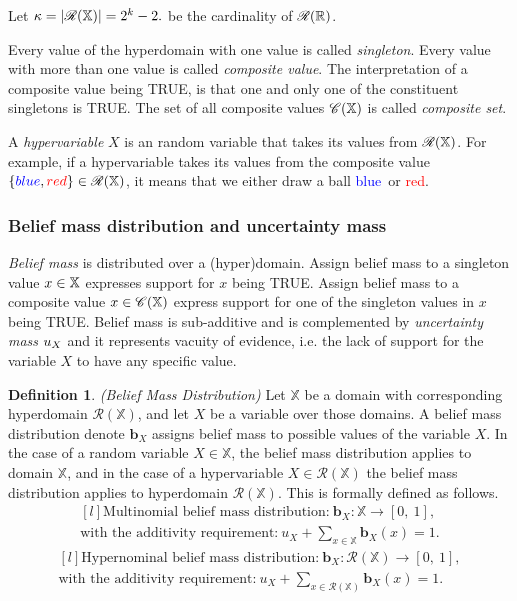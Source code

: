 \documentclass[a4paper,12pt]{article}
\theoremstyle{definition}
\newtheorem{definition}{Definition}[section]
\numberwithin{equation}{section}
\newcommand{\red}{\textcolor{red}{red}}
\newcommand{\blue}{\textcolor{blue}{blue}}
\begin{document}
Let $\kappa = |\mathcal{R}(\mathbb{X})| = 2^k -2\text{.}$ be the cardinality of $\mathcal{R}(\mathbb{R})$.

Every value of the hyperdomain with one value is called \emph{singleton}. Every value with more than one value is called \emph{composite value}. The interpretation of a composite value being TRUE, is that one and only one of the constituent singletons is TRUE. The set of all composite values $\mathcal{C}(\mathbb{X})$ is called \emph{composite set}.

A \emph{hypervariable} $X$ is an random variable that takes its values from $\mathcal{R}(\mathbb{X})$. For example, if a hypervariable takes its values from the composite value $\{\blue, \red\} \in \hdom{X}$, it means that we either draw a ball \blue\ or \red.

\subsubsection{Belief mass distribution and uncertainty mass}

\emph{Belief mass} is distributed over a (hyper)domain. Assign belief mass to a singleton value $x \in \mathbb{X}$ expresses support for $x$ being TRUE. Assign belief mass to a composite value $x \in \mathcal{C}(\mathbb{X})$ express support for one of the singleton values in $x$ being TRUE. Belief mass is sub-additive and is complemented by \emph{uncertainty mass} $u_{X}$ and it represents vacuity of evidence, i.e. the lack of support for the variable $X$ to have any specific value.

\begin{definition}
	\emph{(Belief Mass Distribution)} Let $\mathbb{X}$ be a domain with corresponding hyperdomain $\mathcal{R}(\mathbb{X})$, and let $X$ be a variable over those domains. A belief mass distribution denote $\mathbf{b}_X$ assigns belief mass to possible values of the variable $X$. In the case of a random variable $X \in \mathbb{X}$, the belief mass distribution applies to domain $\mathbb{X}$, and in the case of a hypervariable $X \in \mathcal{R}(\mathbb{X})$ the belief mass distribution applies to hyperdomain $\mathcal{R}(\mathbb{X})$. This is formally defined as follows.
	\begin{equation}\label{eq:multinomial-belief-mass-dristribution}
		\begin{matrix*}[l]
			\text{Multinomial belief mass distribution:}\ \mathbf{b}_X : \mathbb{X} \rightarrow [0,\ 1], \\
			\text{with the additivity requirement:}\ u_X + \sum\limits_{x \in \mathbb{X}} \mathbf{b}_X(x) = 1\text{.}
		\end{matrix*}
	\end{equation}
	\begin{equation}\label{eq:hypernomal_belief_mass_distribution}
		\begin{matrix*}[l]
			\text{Hypernominal belief mass distribution:}\ \mathbf{b}_X : \mathcal{R}(\mathbb{X}) \rightarrow [0,\ 1], \\
			\text{with the additivity requirement:}\ u_X + \sum\limits_{x \in \mathcal{R}(\mathbb{X})} \mathbf{b}_X(x) = 1\text{.}
		\end{matrix*}
	\end{equation}
\end{definition}
\end{document}
